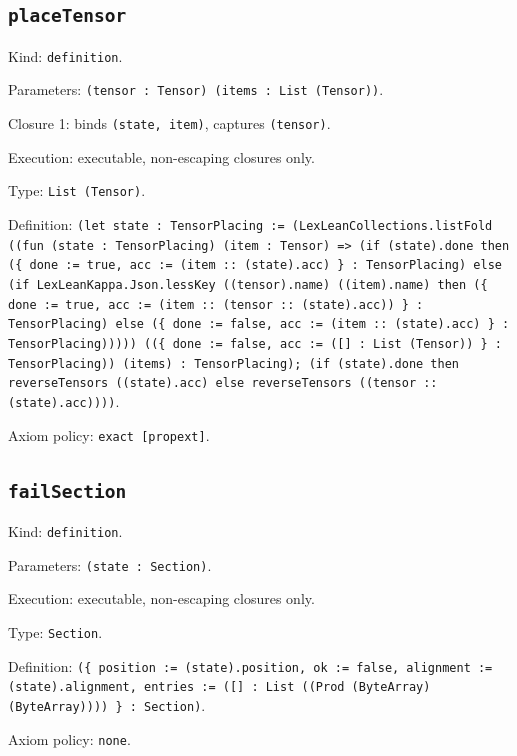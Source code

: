 \documentclass[11pt]{article}
\begin{document}
\subsection*{\texttt{placeTensor}}
\noindent Kind: \texttt{definition}.\par
\noindent Parameters: \texttt{(tensor : Tensor) (items : List (Tensor))}.\par
\noindent Closure 1: binds \texttt{(state, item)}, captures \texttt{(tensor)}.\par
\noindent Execution: executable, non-escaping closures only.\par
\noindent Type: \texttt{List (Tensor)}.\par
\noindent Definition: \texttt{(let state : TensorPlacing := (LexLeanCollections.listFold ((fun (state : TensorPlacing) (item : Tensor) => (if (state).done then (\{ done := true, acc := (item :: (state).acc) \} : TensorPlacing) else (if LexLeanKappa.Json.lessKey ((tensor).name) ((item).name) then (\{ done := true, acc := (item :: (tensor :: (state).acc)) \} : TensorPlacing) else (\{ done := false, acc := (item :: (state).acc) \} : TensorPlacing))))) ((\{ done := false, acc := ([] : List (Tensor)) \} : TensorPlacing)) (items) : TensorPlacing); (if (state).done then reverseTensors ((state).acc) else reverseTensors ((tensor :: (state).acc))))}.\par
\noindent Axiom policy: \texttt{exact [propext]}.\par
\subsection*{\texttt{failSection}}
\noindent Kind: \texttt{definition}.\par
\noindent Parameters: \texttt{(state : Section)}.\par
\noindent Execution: executable, non-escaping closures only.\par
\noindent Type: \texttt{Section}.\par
\noindent Definition: \texttt{(\{ position := (state).position, ok := false, alignment := (state).alignment, entries := ([] : List ((Prod (ByteArray) (ByteArray)))) \} : Section)}.\par
\noindent Axiom policy: \texttt{none}.\par
\end{document}
